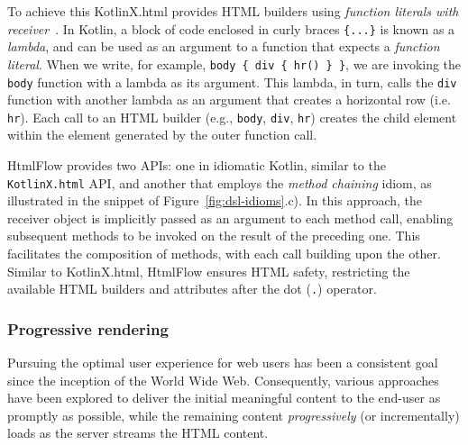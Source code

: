 To achieve this KotlinX.html provides HTML builders using \textit{function
  literals with receiver}~\cite{kotlinlang}. In Kotlin, a block of code enclosed
in curly braces \texttt{\{...\}} is known as a \emph{lambda}, and can be used
as an argument to a function that expects a \emph{function literal}. When we
write, for example, \texttt{body \{ div \{ hr() \} \}}, we are invoking the
\texttt{body} function with a lambda as its argument. This lambda, in turn,
calls the \texttt{div} function with another lambda as an argument that creates
a horizontal row (i.e. \texttt{hr}). Each call to an HTML builder (e.g.,
\texttt{body}, \texttt{div}, \texttt{hr}) creates the child element within the
element generated by the outer function call.

HtmlFlow provides two APIs: one in idiomatic Kotlin, similar to the
\texttt{KotlinX.html} API, and another that employs the \textit{method
  chaining} idiom, as illustrated in the snippet of
Figure~\ref{fig:dsl-idioms}.c). In this approach, the receiver object is
implicitly passed as an argument to each method call, enabling subsequent
methods to be invoked on the result of the preceding one. This facilitates the
composition of methods, with each call building upon the other. Similar to
KotlinX.html, HtmlFlow ensures HTML safety, restricting the available HTML
builders and attributes after the dot (\texttt{.}) operator.


\subsubsection{Progressive rendering}

Pursuing the optimal user experience for web users has been a consistent goal
since the inception of the World Wide Web. Consequently, various approaches
have been explored to deliver the initial meaningful content to the end-user as
promptly as possible, while the remaining content \textit{progressively} (or
incrementally) loads as the server streams the HTML content.

